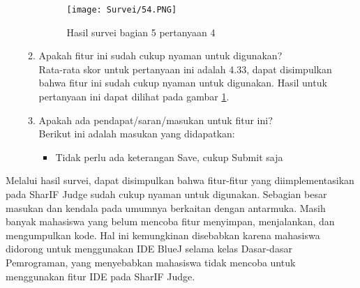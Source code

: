 \begin{enumerate}
\begin{enumerate}
        \begin{figure}[H]
        	\centering  
        	\texttt{[image: Survei/54.PNG]}  
        	\caption{Hasil survei bagian 5 pertanyaan 4}
        	\label{fig:5:survei54} 
        \end{figure}
        \item Apakah fitur ini sudah cukup nyaman untuk digunakan? \\ Rata-rata skor untuk pertanyaan ini adalah 4.33, dapat disimpulkan bahwa fitur ini sudah cukup nyaman untuk digunakan. Hasil untuk pertanyaan ini dapat dilihat pada gambar \ref{fig:5:survei54}.
        \item Apakah ada pendapat/saran/masukan untuk fitur ini? \\ Berikut ini adalah masukan yang didapatkan:
        \begin{itemize}
            \item Tidak perlu ada keterangan Save, cukup Submit saja
        \end{itemize}
    \end{enumerate}
\end{enumerate}

Melalui hasil survei, dapat disimpulkan bahwa fitur-fitur yang diimplementasikan pada SharIF Judge sudah cukup nyaman untuk digunakan. Sebagian besar masukan dan kendala pada umumnya berkaitan dengan antarmuka. Masih banyak mahasiswa yang belum mencoba fitur menyimpan, menjalankan, dan mengumpulkan kode. Hal ini kemungkinan disebabkan karena mahasiswa didorong untuk menggunakan IDE BlueJ selama kelas Dasar-dasar Pemrograman, yang menyebabkan mahasiswa tidak mencoba untuk menggunakan fitur IDE pada SharIF Judge.